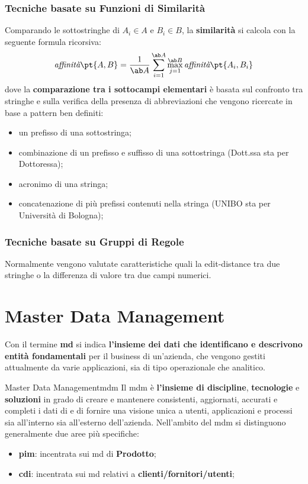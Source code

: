 \subsubsection{Tecniche basate su Funzioni di Similarità}\label{sub:db_tecniche_basate_su_funzioni_di_similarit} %
Comparando le sottostringhe di $A_i \in A$ e $B_i \in B$, la \textbf{similarità} si calcola con la seguente formula ricorsiva:
\[
    \textit{affinità}\pt{A,B} = \frac{1}{\ab A} \sum_{i = 1}^{\ab A}{\max_{j=1}^{\ab B} {\textit{affinità}\pt{A_i,B_i}}}
\]
dove la \textbf{comparazione tra i sottocampi elementari} è basata sul confronto tra stringhe e sulla verifica della presenza di abbreviazioni che vengono ricercate in base a pattern ben definiti:
\begin{itemize}
    \item un prefisso di una sottostringa;
    \item combinazione di un prefisso e suffisso di una sottostringa (Dott.ssa sta per Dottoressa);
    \item acronimo di una stringa;
    \item concatenazione di più prefissi contenuti nella stringa (UNIBO sta per Università di Bologna);
\end{itemize}
%
\subsubsection{Tecniche basate su Gruppi di Regole}\label{sub:db_tecniche_basate_su_gruppi_di_regole} %
Normalmente vengono valutate caratteristiche quali la edit-distance tra due stringhe o la differenza di valore tra due campi numerici.
%
\section{Master Data Management}\label{sec:db_master_data_management} %
Con il termine \textbf{\ac{md}} si indica \textbf{l'insieme dei dati che identificano e descrivono entità fondamentali} per il business di un'azienda, che vengono gestiti attualmente da varie applicazioni, sia di tipo operazionale che analitico.
\begin{definition}{Master Data Management}{mdm}
    Il \ac{mdm} è \textbf{l'insieme di discipline}, \textbf{tecnologie} e \textbf{soluzioni} in grado di creare e mantenere consistenti, aggiornati, accurati e completi i dati di  e di fornire una visione unica a utenti, applicazioni e processi sia all'interno sia all'esterno dell'azienda.
    Nell'ambito del \ac{mdm} si distinguono generalmente due aree più specifiche:
    \begin{itemize}
        \item \textbf{\ac{pim}}: incentrata sui \ac{md} di \textbf{Prodotto};
        \item \textbf{\ac{cdi}}: incentrata sui \ac{md} relativi a \textbf{clienti/fornitori/utenti};
    \end{itemize}
\end{definition}
%
